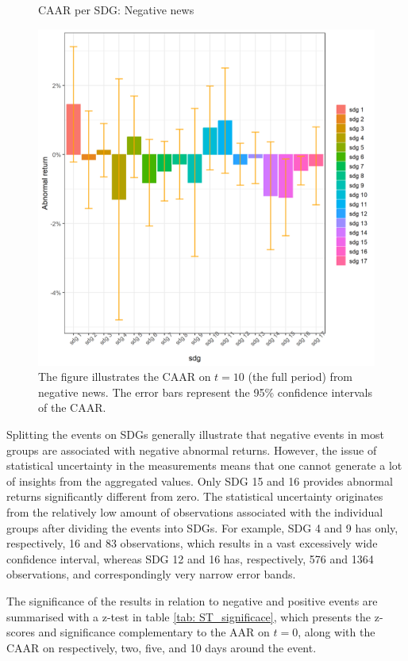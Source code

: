 \begin{figure} [H]
    \centering
    \caption{CAAR per SDG: Negative news}
    \includegraphics[scale=0.6]{Projekt/1.Figures analysis/ST_negative_sdg_bar.png}
    \caption*{\footnotesize The figure illustrates the CAAR on $t = 10$ (the full period) from negative news. The error bars represent the 95\% confidence intervals of the CAAR.}
    \label{fig:ST_neg_bar}
\end{figure}

Splitting the events on SDGs generally illustrate that negative events in most groups are associated with negative abnormal returns. However, the issue of statistical uncertainty in the measurements means that one cannot generate a lot of insights from the aggregated values. Only SDG 15 and 16 provides abnormal returns significantly different from zero. The statistical uncertainty originates from the relatively low amount of observations associated with the individual groups after dividing the events into SDGs. For example, SDG 4 and 9 has only, respectively, 16 and 83 observations, which results in a vast excessively wide confidence interval, whereas SDG 12 and 16 has, respectively, 576 and 1364 observations, and correspondingly very narrow error bands. 

The significance of the results in relation to negative and positive events are summarised with a z-test in table \ref{tab: ST_significace}, which presents the z-scores and significance complementary to the AAR on $t=0$, along with the CAAR on respectively, two, five, and 10 days around the event.  



